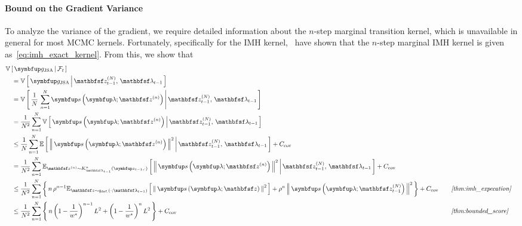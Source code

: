 \begin{proofEnd}
  \paragraph{\textbf{Bound on the Gradient Variance}}
  To analyze the variance of the gradient, we require detailed information about the \(n\)-step marginal transition kernel, which is unavailable in general for most MCMC kernels.
  Fortunately, specifically for the IMH kernel,~\citet{Smith96exacttransition} have shown that the \(n\)-step marginal IMH kernel is given as~\cref{eq:imh_exact_kernel}.
  From this, we show that
  \begin{alignat}{2}
    &\V{ \vg_{\mathrm{JSA}} \,\middle|\, \mathcal{F}_{t} }
    \nonumber
    \\
    &\quad=
    \V{ \vg_{\mathrm{JSA}} \,\middle|\, \rvvz_{t-1}^{(N)},\, \rvvlambda_{t-1} }
    \nonumber
    \\
    &\quad=
    \V{ \frac{1}{N}\,\sum^{N}_{n=1}\vs\left(\vlambda; \rvvz^{(n)}\right)  \,\middle|\, \rvvz_{t-1}^{(N)},\, \rvvlambda_{t-1} }
    \nonumber
    \\
    &\quad=
    \frac{1}{N^2} \sum^{N}_{n=1} \V{ \vs\left(\vlambda; \rvvz^{(n)}\right)  \,\middle|\, \rvvz_{t-1}^{(N)},\, \rvvlambda_{t-1} }
    \nonumber
    \\
    &\quad\leq
    \frac{1}{N}\sum^{N}_{n=1} \E{ \norm{ \vs\left(\vlambda; \rvvz^{(n)}\right) }^2 \,\middle|\, \rvvz_{t-1}^{(N)},\, \rvvlambda_{t-1} } + C_{\text{cov}}
    \nonumber
    \\
    &\quad=
    \frac{1}{N^2}\sum^{N}_{n=1} \Esub{\rvvz^{(n)} \sim K^n_{\rvvlambda_{t-1}}\left(\vz_{t-1}, \cdot\right)}{ \norm{\vs\left(\vlambda; \rvvz^{(n)}\right) }^2 \,\middle|\,  \rvvz_{t-1}^{(N)},\, \rvvlambda_{t-1} }
    + 
    C_{\text{cov}}
    \nonumber
    \\
    &\quad\leq
    \frac{1}{N^2}\sum^{N}_{n=1}
    \left\{\,
      n \, {\rho}^{n-1}
      \Esub{\rvvz \sim q_{\text{def.}}\left(\cdot; \rvvlambda_{t-1}\right)}{ \norm{\vs\left(\vlambda; \rvvz \right)}^2 }
      + 
      {\rho}^{n} \, \norm{\vs\left(\vlambda; \rvvz_{t-1}^{(N)} \right)}^2
      \,\right\}
      +
    C_{\text{cov}}
    &&\quad\text{\textit{\cref{thm:imh_expecation}}}
    \nonumber
    \\
    &\quad\leq
    \frac{1}{N^2}\sum^{N}_{n=1}
    \left\{\,
      n \, {\left(1 - \frac{1}{w^*}\right)}^{n-1}  \, L^2
      +
      {\left(1 - \frac{1}{w^*}\right)}^{n} \, L^2
      \,\right\}
      +
    C_{\text{cov}}
    &&\quad\text{\textit{\cref{thm:bounded_score}}}
    \nonumber
    \\

\end{alignat}
\end{proofEnd}
